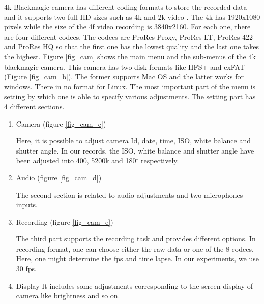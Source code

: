 \documentclass[[12pt,DIV14,BCOR12mm,a4paper,footexclude,headinclude,halfparskip-,twoside,openright,cleardoubleempty,idxtotoc,bibtotoc]{article}
\begin{document}
4k Blackmagic camera has different coding formats to store the recorded data and it supports two full HD sizes such as 4k and 2k video . The 4k has 1920x1080 pixels while the size of the 4f video recording is 3840x2160. For each one, there are four different codecs. The codecs are ProRes Proxy, ProRes LT, ProRes 422 and ProRes HQ so that the first one has the lowest quality and the last one takes the highest. Figure \ref{fig_cam} shows the main menu and the sub-menus of the 4k blackmagic camera. This camera has two  disk formats like HFS+ and exFAT (Figure \ref{fig_cam_b}). The former supports Mac OS and the latter works for windows. There in no format for Linux. The most important part of the menu is setting by which one is able to specify various adjustments. The setting part has 4 different sections.  

\begin{enumerate}

	\item Camera (figure \ref{fig_cam_c})

	Here, it is possible to adjust camera Id, date, time, ISO, white balance and shutter angle. In our records, the ISO, white balance and shutter angle have been adjusted into 400, 5200k and 180$^{\circ}$ respectively.

	\item Audio (figure \ref{fig_cam_d})

	The second section is related to audio adjustments and two microphones inputs.

	\item Recording (figure \ref{fig_cam_e})

	The third part supports the recording task and provides different options. In recording format, one can choose either the raw data or one of the 8 codecs. Here, one might determine the fps and time lapse. In our experiments, we use 30 fps.	

	\item Display
	It includes some adjustments corresponding to the screen display of camera like brightness and so on.


\end{enumerate}
\end{document}
